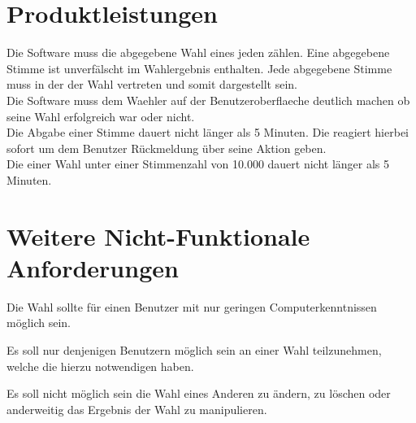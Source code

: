 \documentclass[parskip=full,11pt,twoside]{scrartcl}
\begin{document}
\section{Produktleistungen}
Die Software muss die abgegebene \gls{Wahl} eines jeden  zählen. Eine abgegebene \gls{Stimme} ist unverfälscht im Wahlergebnis enthalten.
Jede abgegebene \gls{Stimme} muss in der  der \gls{Wahl} vertreten und somit dargestellt sein. \\
Die Software muss dem \gls{Waehler} auf der \gls{Benutzeroberflaeche} deutlich machen ob seine \gls{Wahl} erfolgreich war oder nicht. \\
Die Abgabe einer \gls{Stimme} dauert nicht länger als 5 Minuten.
Die  reagiert hierbei sofort um dem \gls{Benutzer} Rückmeldung über seine Aktion geben. \\
Die  einer \gls{Wahl} unter einer Stimmenzahl von 10.000  dauert nicht länger als 5 Minuten.

\section{Weitere Nicht-Funktionale Anforderungen}

Die \gls{Wahl} sollte für einen \gls{Benutzer} mit nur geringen Computerkenntnissen möglich sein.

Es soll nur denjenigen Benutzern möglich sein an einer \gls{Wahl} teilzunehmen, welche die hierzu notwendigen  haben.

Es soll nicht möglich sein die \gls{Wahl} eines Anderen zu ändern,  zu löschen oder anderweitig das Ergebnis der \gls{Wahl} zu manipulieren.
\end{document}
